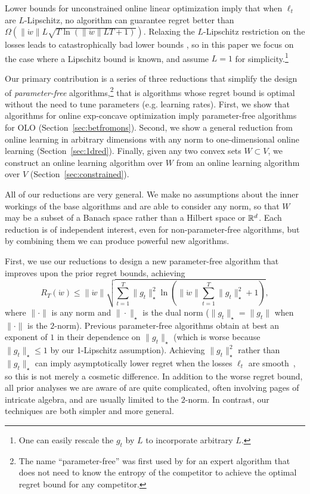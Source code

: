 \documentclass[12pt]{colt2018} %
\newcommand{\w}{\mathring{w}}
\begin{document}
Lower bounds for unconstrained online linear optimization \citep{mcmahan2012no, orabona2013dimension} imply that when $\ell_t$ are $L$-Lipschitz, no algorithm can guarantee regret better than $\Omega(\|\w\| L \sqrt{T\ln(\|\w\|L T+1)})$. Relaxing the $L$-Lipschitz restriction on the losses leads to catastrophically bad lower bounds \citep{cutkosky2017online}, so in this paper we focus on the case where a Lipschitz bound is known, and assume $L=1$ for simplicity.\footnote{One can easily rescale the $g_t$ by $L$ to incorporate arbitrary $L$.}

Our primary contribution is a series of three reductions that simplify the design of \emph{parameter-free} algorithms,\footnote{The name ``parameter-free'' was first used by \citet{chaudhuri2009parameter} for an expert algorithm that does not need to know the entropy of the competitor to achieve the optimal regret bound for any competitor.} that is algorithms whose regret bound is optimal without the need to tune parameters (e.g. learning rates). First, we show that algorithms for online exp-concave optimization imply parameter-free algorithms for OLO (Section~\ref{sec:betfromons}). Second, we show a general reduction from online learning in arbitrary dimensions with any norm to one-dimensional online learning (Section~\ref{sec:1dred}). Finally, given any two convex sets $W\subset V$, we construct an online learning algorithm over $W$ from an online learning algorithm over $V$ (Section~\ref{sec:constrained}).

All of our reductions are very general. We make no assumptions about the inner workings of the base algorithms and are able to consider any norm, so that $W$ may be a subset of a Banach space rather than a Hilbert space or $\mathbb{R}^d$. Each reduction is of independent interest, even for non-parameter-free algorithms, but by combining them we can produce powerful new algorithms. 

First, we use our reductions to design a new parameter-free algorithm that improves upon the prior regret bounds, achieving
\[
R_T(\w) \le \|\w\|\sqrt{\sum_{t=1}^T \|g_t\|_\star^2\ln\left(\|\w\|\sum_{t=1}^T \|g_t\|_\star^2+1\right)},
\]
where $\|\cdot\|$ is any norm and $\|\cdot\|_\star$ is the dual norm ($\|g_t\|_\star=\|g_t\|$ when $\|\cdot\|$ is the $2$-norm). Previous parameter-free algorithms \cite{mcmahan2012no, mcmahan2014unconstrained, orabona2014simultaneous, orabona2016coin, foster2015adaptive, cutkosky2017online, orabona2017training} obtain at best an exponent of $1$ in their dependence on $\|g_t\|_\star$ (which is worse because $\|g_t\|_\star\le 1$ by our 1-Lipschitz assumption). Achieving $\|g_t\|_\star^2$ rather than $\|g_t\|_\star$ can imply asymptotically lower regret when the losses $\ell_t$ are smooth~\citep{srebro2010smoothness}, so this is not merely a cosmetic difference. In addition to the worse regret bound, all prior analyses we are aware of are quite complicated, often involving pages of intricate algebra, and are usually limited to the $2$-norm. In contrast, our techniques are both simpler and more general.
\end{document}
